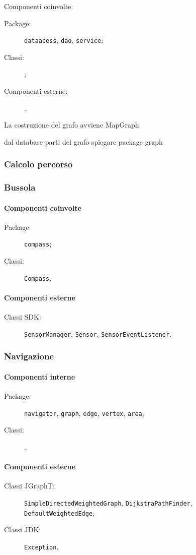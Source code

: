 \documentclass[../Funzionalita.tex]{subfiles}
\begin{document}
			Componenti coinvolte:
			\begin{description}
				\item[Package:] \verb|dataacess|, \verb|dao|, \verb|service|;
				\item[Classi:] \verb||;
				\item[Componenti esterne:] .
			\end{description}
			
			La costruzione del grafo avviene 
				MapGraph
				
				
			dal database
			parti del grafo
			spiegare package graph
			
			
		
		\subsubsection{Calcolo percorso}
		
		\subsubsection{Bussola}
		
			\paragraph*{Componenti coinvolte}
			\begin{description}
				\item[Package:] \verb|compass|;
				\item[Classi:] \verb|Compass|.
			\end{description}

			\paragraph*{Componenti esterne}
			\begin{description}
				\item[Classi SDK:] \verb|SensorManager|, \verb|Sensor|, \verb|SensorEventListener|.
			\end{description}
			
			
			
		
		\subsubsection{Navigazione}
		
			\paragraph*{Componenti interne}
			\begin{description}
				\item[Package:] \verb|navigator|, \verb|graph|, \verb|edge|, \verb|vertex|, \verb|area|;
				\item[Classi:] \verb||.
			\end{description}
			
			\paragraph*{Componenti esterne}
			\begin{description}
				\item[Classi JGraphT:] \verb|SimpleDirectedWeightedGraph|, \verb|DijkstraPathFinder|, \verb|DefaultWeightedEdge|;
				\item[Classi JDK:] \verb|Exception|.
			\end{description}
\end{document}
